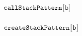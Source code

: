\subsubsection{$\texttt{call}\texttt{StackPattern}\big[\textsf{b}\big]$ \lispDone{}}                                                          \label{hub: stack patterns: call}             
\subsubsection{$\texttt{create}\texttt{StackPattern}\big[\textsf{b}\big]$ \lispDone{}}                                                        \label{hub: stack patterns: create}           
